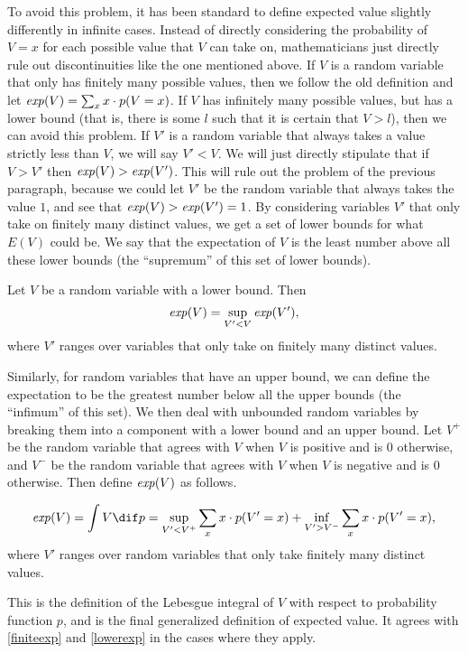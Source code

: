 To avoid this problem, it has been standard to define expected value slightly differently in infinite cases. Instead of directly considering the probability of $V=x$ for each possible value that $V$ can take on, mathematicians just directly rule out discontinuities like the one mentioned above. If $V$ is a random variable that only has finitely many possible values, then we follow the old definition and let $\text{\textit{exp}}(V)=\sum_{x}x\cdot p(V=x)$. If $V$ has infinitely many possible values, but has a lower bound (that is, there is some $l$ such that it is certain that $V>l$), then we can avoid this problem. If $V'$ is a random variable that always takes a value strictly less than $V$, we will say $V'<V$. We will just directly stipulate that if $V>V'$ then $\text{\textit{exp}}(V)>\text{\textit{exp}}(V')$. This will rule out the problem of the previous paragraph, because we could let $V'$ be the random variable that always takes the value $1$, and see that $\text{\textit{exp}}(V)>\text{\textit{exp}}(V')=1$. By considering variables $V'$ that only take on finitely many distinct values, we get a set of lower bounds for what $E(V)$ could be. We say that the expectation of $V$ is the least number above all these lower bounds (the ``supremum'' of this set of lower bounds).
\begin{definition}\label{lowerexp}
Let $V$ be a random variable with a lower bound. Then
$$\text{\textit{exp}}(V)=\sup_{V'<V}\text{\textit{exp}}(V'),$$
where $V'$ ranges over variables that only take on finitely many distinct values.
\end{definition}
Similarly, for random variables that have an upper bound, we can define the expectation to be the greatest number below all the upper bounds (the ``infimum'' of this set). We then deal with unbounded random variables by breaking them into a component with a lower bound and an upper bound. Let $V^+$ be the random variable that agrees with $V$ when $V$ is positive and is $0$ otherwise, and $V^-$ be the random variable that agrees with $V$ when $V$ is negative and is $0$ otherwise. Then define $\text{\textit{exp}}(V)$ as follows.
\begin{definition}\label{expectation}
$$\text{\textit{exp}}(V)=\int V \dif p = \sup_{V'<V^+}\sum_x x\cdot p(V'=x)+\inf_{V'>V^-}\sum_x x\cdot p(V'=x),$$
where $V'$ ranges over random variables that only take finitely many distinct values.
\end{definition}
This is the definition of the Lebesgue integral of $V$ with respect to probability function $p$, and is the final generalized definition of expected value. It agrees with \autoref{finiteexp} and \autoref{lowerexp} in the cases where they apply. 

